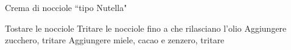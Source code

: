 \begin{recipe}{Crema di nocciole ``tipo Nutella"}
    \begin{header}
    
    \end{header}
    
    \begin{ingredients}
    \end{ingredients}
    
    \begin{preparation}
        \step Tostare le nocciole
        \step Tritare le nocciole fino a che rilasciano l'olio
        \step Aggiungere zucchero, tritare
        \step Aggiungere miele, cacao e zenzero, tritare
    \end{preparation}
\end{recipe}

